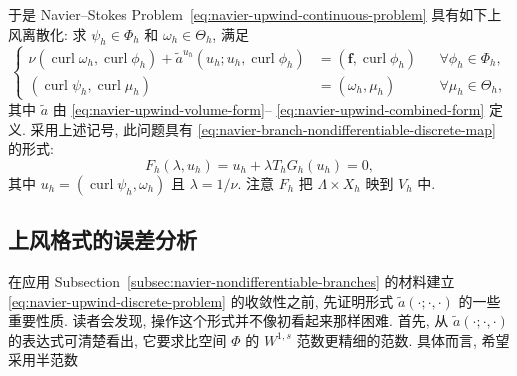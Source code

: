 于是 Navier--Stokes Problem~\eqref{eq:navier-upwind-continuous-problem}
具有如下上风离散化: 求 $\psi_h\in\Phi_h$ 和 $\omega_h\in\Theta_h$, 满足
\begin{equation}\label{eq:navier-upwind-discrete-problem}
\left\{
\begin{aligned}
\nu(\operatorname{curl}\omega_h,\operatorname{curl}\phi_h)
+\widetilde a^{u_h}(u_h;u_h,\operatorname{curl}\phi_h)
&=(\boldsymbol f,\operatorname{curl}\phi_h)
&&\forall\phi_h\in\Phi_h,\\
(\operatorname{curl}\psi_h,\operatorname{curl}\mu_h)
&=(\omega_h,\mu_h)
&&\forall\mu_h\in\Theta_h,
\end{aligned}
\right.
\end{equation}
其中 $\widetilde a$ 由 \eqref{eq:navier-upwind-volume-form}--
\eqref{eq:navier-upwind-combined-form} 定义. 采用上述记号, 此问题具有
\eqref{eq:navier-branch-nondifferentiable-discrete-map} 的形式:
\begin{equation}\label{eq:navier-upwind-discrete-operator}
F_h(\lambda,u_h)=u_h+\lambda T_hG_h(u_h)=0,
\end{equation}
其中 $u_h=(\operatorname{curl}\psi_h,\omega_h)$ 且 $\lambda=1/\nu$.
注意 $F_h$ 把 $\Lambda\times X_h$ 映到 $V_h$ 中.

\subsection{上风格式的误差分析}
\label{subsec:navier-upwind-error-analysis}

在应用 Subsection~\ref{subsec:navier-nondifferentiable-branches} 的材料建立
\eqref{eq:navier-upwind-discrete-problem} 的收敛性之前, 先证明形式
$\widetilde a(\mathord\cdot;\mathord\cdot,\mathord\cdot)$ 的一些重要性质.
读者会发现, 操作这个形式并不像初看起来那样困难. 首先, 从
$\widetilde a(\mathord\cdot;\mathord\cdot,\mathord\cdot)$ 的表达式可清楚看出,
它要求比空间 $\Phi$ 的 $W^{1,s}$ 范数更精细的范数. 具体而言, 希望采用半范数

